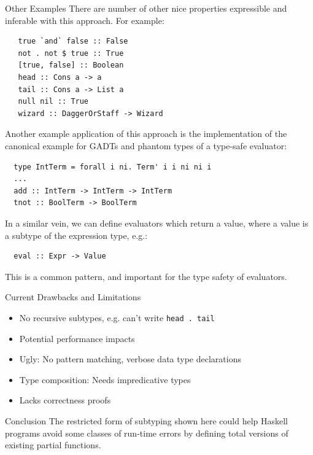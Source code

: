 \documentclass[final]{beamer}
\begin{document}
\begin{frame}[fragile]
\begin{columns}[t]
\begin{column}{.285\textwidth}
\begin{block}{Other Examples}
\vspace{0.5cm}
There are number of other nice properties expressible and inferable with this
approach. For example:

\begin{verbatim}
   true `and` false :: False
   not . not $ true :: True
   [true, false] :: Boolean
   head :: Cons a -> a
   tail :: Cons a -> List a
   null nil :: True
   wizard :: DaggerOrStaff -> Wizard
\end{verbatim}

Another example application of this approach is the implementation of the
canonical example for GADTs and phantom types of a type-safe evaluator:

\begin{verbatim}
  type IntTerm = forall i ni. Term' i i ni ni i
  ...
  add :: IntTerm -> IntTerm -> IntTerm
  tnot :: BoolTerm -> BoolTerm 
\end{verbatim}

In a similar vein, we can define evaluators which return a value, where a value
is a subtype of the expression type, e.g.:

\begin{verbatim}
  eval :: Expr -> Value
\end{verbatim}

This is a common pattern, and important for the type safety of evaluators. 

\end{block}
\vspace{2cm}
\begin{block}{Current Drawbacks and Limitations}
\vspace{0.5cm}
\begin{itemize}
\item No recursive subtypes, e.g. can't write \verb!head . tail!
\item Potential performance impacts
\item Ugly: No pattern matching, verbose data type declarations 
\item Type composition: Needs impredicative types
\item Lacks correctness proofs
\end{itemize}
\vspace{2cm}
\end{block}

\begin{block}{Conclusion}
\vspace{0.5cm}
The restricted form of subtyping shown here could help Haskell programs avoid
some classes of run-time errors by defining total versions of existing partial
functions. 
\end{block}
\end{column}
\end{columns}
\end{frame}
\end{document}
